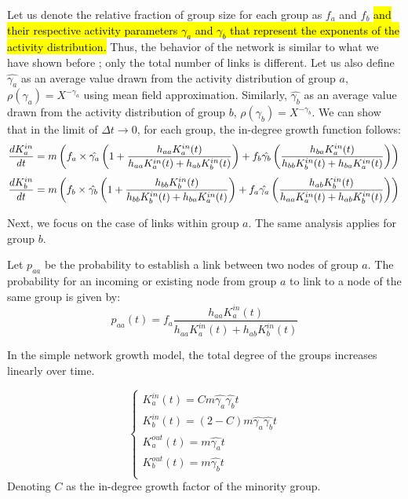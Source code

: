 \documentclass[fleqn,10pt]{wlscirep}
\begin{document}
Let us denote the relative fraction of group size for each group as $f_a$ and $f_b$ \hl{and their respective activity parameters $\gamma_a$ and $\gamma_b$ that represent the exponents of the activity distribution.} Thus, the behavior of the network is similar to what we have shown before \cite{karimi2018homophily}; only the total number of links is different.  
Let us also define $\hat{\gamma_a}$ as an average value drawn from the activity distribution of group $a$, $\rho(\gamma_a) = X^{-\gamma_a}$ using mean field approximation. Similarly, $\hat{\gamma_b}$ as an average value drawn from the activity distribution of group $b$, $\rho(\gamma_b) = X^{-\gamma_b}$.
We can show that in the limit of $\Delta t \rightarrow 0$, for each group, the in-degree growth function follows: %
\begin{equation}
    \label{req:evol_ka}
    \dfrac{dK_a^{in}}{dt} = m \left(f_a \times \hat{\gamma_a} \left(1 + \dfrac{h_{aa}K^{in}_a(t)}{h_{aa}K^{in}_a(t) + h_{ab}K^{in}_b(t)}\right) + f_b  \hat{\gamma_b} \left(\dfrac{h_{ba}K^{in}_a(t)}{h_{bb}K^{in}_b(t) + h_{ba}K^{in}_a(t)}\right)\right)\\
\end{equation}
\begin{equation}
    \label{req:evol_kb}
    \dfrac{dK_b^{in}}{dt} = m \left(f_b \times \hat{\gamma_b} \left(1 + \dfrac{h_{bb}K^{in}_b(t)}{h_{bb}K^{in}_b(t) + h_{ba}K^{in}_a(t)}\right) + f_a \hat{\gamma_a} \left(\dfrac{h_{ab}K^{in}_b(t)}{h_{aa}K^{in}_a(t) + h_{ab}K^{in}_b(t)}\right)\right)\\
\end{equation}

Next, we focus on the case of links within group $a$. The same analysis applies for group $b$. 

Let $p_{aa}$ be the probability to establish a link between two nodes of group $a$. %
The probability for an incoming or existing node from group $a$ to link to a node of the same group is given by:
\begin{equation}
\label{eq:paa}
 p_{aa}(t) = f_a\dfrac{h_{aa}K_{a}^{in}(t)}{h_{aa}K_{a}^{in}(t) + h_{ab}K_{b}^{in}(t)}
\end{equation}

In the simple network growth model, the total degree of the groups increases linearly over time.

\begin{equation}
  \left\{
    \begin{array}{l}
      K_a^{in}(t) = C m \hat{\gamma_a} \hat{\gamma_b} t\\
      K_b^{in}(t) = (2-C) m \hat{\gamma_a} \hat{\gamma_b} t\\
      K_a^{out}(t) = m \hat{\gamma_a} t\\
      K_b^{out}(t) = m \hat{\gamma_b} t\\
    \end{array}
  \right.
\end{equation}
Denoting $C$ as the in-degree growth factor of the minority group.
\end{document}
